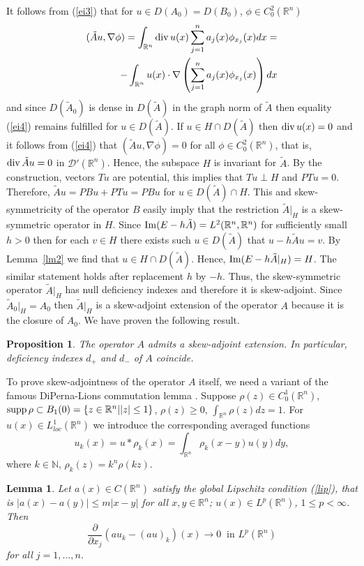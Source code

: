 \documentclass[12pt]{article}
\newcommand{\R}{{\mathbb R}}
\newcommand{\N}{{\mathbb N}}
\newcommand{\D}{{\mathcal D}}
\newcommand{\supp}{\mathop{\rm supp}}
\renewcommand{\div}{\mathop{\rm div}\nolimits}
\renewcommand{\Im}{\mathop{\rm Im}}
\numberwithin{equation}{section}
\theoremstyle{plain}
\newtheorem{lemma}{Lemma}[section]
\newtheorem{proposition}{Proposition}[section]
\theoremstyle{definition}
\begin{document}
It follows from (\ref{ei3}) that for $u\in D(A_0)=D(B_0)$, $\phi\in C_0^2(\R^n)$
\begin{align}\label{ei4} (\tilde Au,\nabla\phi)=\int_{\R^n}\div u(x)\sum_{j=1}^n a_j(x)\phi_{x_j}(x)dx=\nonumber\\
-\int_{\R^n}u(x)\cdot\nabla\left(\sum_{j=1}^n a_j(x)\phi_{x_j}(x)\right)dx
\end{align}
and since $D(\tilde A_0)$ is dense in $D(\tilde A)$ in the graph norm of $\tilde A$ then equality (\ref{ei4}) remains fulfilled for $u\in D(\tilde A)$. If $u\in H\cap D(\tilde A)$ then $\div u(x)=0$ and it follows from (\ref{ei4}) that  $(\tilde Au,\nabla\phi)=0$ for all $\phi\in C_0^2(\R^n)$, that is, $\div\tilde Au=0$ in $\D'(\R^n)$. Hence, the subspace $H$ is invariant for $\tilde A$. By the construction, vectors $Tu$ are potential, this implies that $Tu\perp H$ and $PTu=0$. Therefore, $\tilde Au=PBu+PTu=PBu$ for $u\in D(\tilde A)\cap H$. This and skew-symmetricity of the operator $B$ easily imply that the restriction $\tilde A|_H$ is a skew-symmetric operator in $H$.
Since $\Im(E-h\tilde A)=L^2(\R^n,\R^n)$ for sufficiently small $h>0$ then for each $v\in H$ there exists such $u\in D(\tilde A)$ that $u-h\tilde Au=v$. By Lemma~\ref{lm2} we find that $u\in H\cap D(\tilde A)$. Hence,
$\Im (E-h\tilde A|_H)=H$. The similar statement holds after replacement $h$ by $-h$.
Thus, the skew-symmetric operator $\tilde A|_H$ has null deficiency indexes and therefore it is skew-adjoint.
Since $\tilde A_0|_H=A_0$ then $\tilde A|_H$ is a skew-adjoint extension of the operator $A$ because it is the closure of $A_0$. We have proven the following result.

\begin{proposition}\label{pro2}
The operator $A$ admits a skew-adjoint extension. In particular, deficiency indexes $d_+$ and $d_-$ of $A$ coincide.
\end{proposition}

To prove skew-adjointness of the operator $A$ itself, we need a variant of the famous DiPerna-Lions commutation lemma
\cite[Lemma~II.1]{DiL}. Suppose $\rho(z)\in C_0^1(\R^n)$, $\supp\rho\subset B_1(0)=\{z\in\R^n | |z|\le 1\}$, $\rho(z)\ge 0$, $\int_{\R^n}\rho(z)dz=1$. For $u(x)\in L^1_{loc}(\R^n)$ we introduce the corresponding averaged functions
\[u_k(x)=u*\rho_k(x)=\int_{\R^n}\rho_k(x-y)u(y)dy,\]
where $k\in\N$, $\rho_k(z)=k^n\rho(kz)$.

\begin{lemma}\label{lmDL}
Let $a(x)\in C(\R^n)$ satisfy the global Lipschitz condition (\ref{lip}), that is
$|a(x)-a(y)|\le m|x-y|$ for all $x,y\in\R^n$; $u(x)\in L^p(\R^n)$, $1\le p<\infty$. Then
\begin{equation}\label{DL}
\frac{\partial}{\partial x_j}(au_k-(au)_k)(x)\to 0 \ \mbox{ in } L^p(\R^n)
\end{equation}
for all $j=1,\ldots,n$.
\end{lemma}
\end{document}
